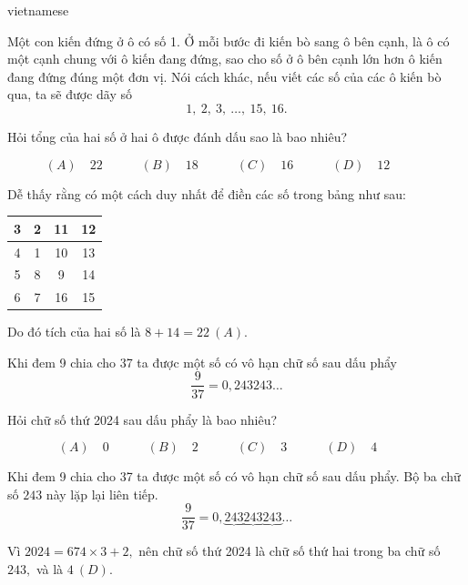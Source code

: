 \documentclass{article}
\begin{document}
\begin{otherlanguage*}{vietnamese}
\begin{problem*}[PI-2024-C-P8]
    Một con kiến đứng ở ô có số 1. Ở mỗi bước đi kiến bò sang ô bên cạnh, là ô có một cạnh chung với ô kiến đang đứng,
    sao cho số ở ô bên cạnh lớn hơn ô kiến đang đứng đúng một đơn vị. Nói cách khác, nếu viết các số của các ô kiến bò qua, ta sẽ được dãy số
    \[
        1,\ 2,\ 3,\ \ldots,\ 15,\ 16.
    \]

    Hỏi tổng của hai số ở hai ô được đánh dấu sao là bao nhiêu?

    \[
        (A) \quad 22 \qquad \quad
        (B) \quad 18 \qquad \quad
        (C) \quad 16 \qquad \quad
        (D) \quad 12 \qquad \quad
    \]
\end{problem*}

\begin{soln}
    Dễ thấy rằng có một cách duy nhất để điền các số trong bảng như sau:
    \begin{center}
        \begin{tabular}{|c|c|c|c|}
        \hline
        3 & 2 & 11 & 12 \\ \hline
        4 & 1 & 10 & 13 \\ \hline
        5 & 8 & 9  & 14 \\ \hline
        6 & 7 & 16 & 15 \\ \hline
        \end{tabular}
    \end{center}

    Do đó tích của hai số là $8 + 14 = \boxed{22\ (A).}$
\end{soln}

\bigbreak

\begin{problem*}[PI-2024-C-P9]
    \label{problem:pi-2024-c-p9}

    Khi đem 9 chia cho 37 ta được một số có vô hạn chữ số sau dấu phẩy
    \[
        \frac{9}{37} = 0,243243\ldots
    \]

    Hỏi chữ số thứ 2024 sau dấu phẩy là bao nhiêu?

    \[
        (A) \quad 0 \qquad \quad
        (B) \quad 2 \qquad \quad
        (C) \quad 3 \qquad \quad
        (D) \quad 4 \qquad \quad
    \]
\end{problem*}

\begin{soln}
    Khi đem 9 chia cho 37 ta được một số có vô hạn chữ số sau dấu phẩy. Bộ ba chữ số $243$ này lặp lại liên tiếp.
    \[
        \frac{9}{37} = 0,\underbrace{243}\underbrace{243}\underbrace{243}\ldots
    \]

    Vì $2024 = 674 \times 3 + 2,$ nên chữ số thứ 2024 là chữ số thứ hai trong ba chữ số $243,$ và là $\boxed{4\ (D).}$
\end{soln}


\end{otherlanguage*}
\end{document}
